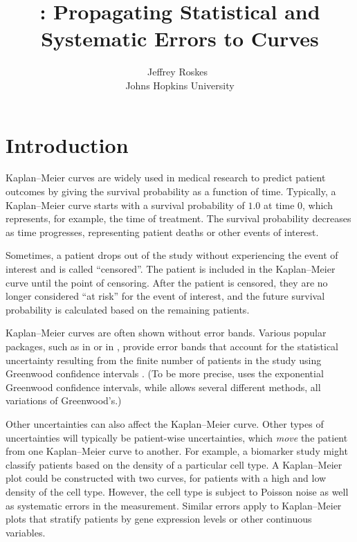 \documentclass[article]{jss}
\author{Jeffrey Roskes~\orcidlink{0000-0001-8761-0490}\\Johns Hopkins University} %
\title{\pkg{KoMbine}: Propagating Statistical and Systematic Errors to \KM{} Curves}
\newcommand{\KM}{Kaplan--Meier} %
\begin{document}


\section{Introduction}\label{sec:intro}

\KM{} curves are widely used in medical research to predict patient outcomes by giving the survival probability as a function of time.  Typically, a \KM{} curve starts with a survival probability of \(1.0\) at time \(0\), which represents, for example, the time of treatment.  The survival probability decreases as time progresses, representing patient deaths or other events of interest.

Sometimes, a patient drops out of the study without experiencing the event of interest and is called ``censored''.  The patient is included in the \KM{} curve until the point of censoring.  After the patient is censored, they are no longer considered ``at risk'' for the event of interest, and the future survival probability is calculated based on the remaining patients.

\KM{} curves are often shown without error bands.  Various popular packages, such as  \citep{survival-package} in  \citep{R} or  \citep{lifelines} in , provide error bands that account for the statistical uncertainty resulting from the finite number of patients in the study using Greenwood confidence intervals \citep{GreenwoodNotes,Greenwood}.  (To be more precise,  uses the exponential Greenwood confidence intervals, while  allows several different methods, all variations of Greenwood's.)

Other uncertainties can also affect the \KM{} curve.  Other types of uncertainties will typically be patient-wise uncertainties, which \emph{move} the patient from one \KM{} curve to another.  For example, a biomarker study might classify patients based on the density of a particular cell type.  A \KM{} plot could be constructed with two curves, for patients with a high and low density of the cell type.  However, the cell type is subject to Poisson noise as well as systematic errors in the measurement.  Similar errors apply to \KM{} plots that stratify patients by gene expression levels or other continuous variables.
\end{document}
